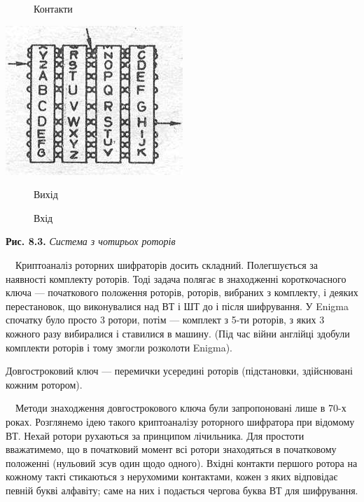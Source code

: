 \begin{figure}
\centering
\begin{minipage}{1in}
Контакти
\end{minipage}
\end{figure}

\bigskip

{\centering 
\includegraphics[width=2.6354in,height=2.2189in]{crypt-img/crypt-img79.jpg}
\par}

\begin{figure}
\centering
\begin{minipage}{0.6583in}
Вихід
\end{minipage}
\end{figure}
\begin{figure}
\centering
\begin{minipage}{0.5417in}
Вхід
\end{minipage}
\end{figure}
{\centering
\textbf{Рис. 8.3. }\textit{Система з чотирьох роторів}
\par}


\bigskip

\ \ Криптоаналіз роторних шифраторів досить складний. Полегшується за наявності
комплекту роторів. Тоді задача полягає в знаходженні короткочасного ключа ---
початкового положення роторів, роторів, вибраних з комплекту, і деяких
перестановок, що виконувалися над ВТ і ШТ до і після шифрування. У Enigma
спочатку було просто 3 ротори, потім --- комплект з 5-ти роторів, з яких 3
кожного разу вибиралися і ставилися в машину. (Під час війни англійці здобули
комплекти роторів і тому змогли розколоти Enigma).

Довгостроковий ключ --- перемички усередині роторів (підстановки, здійснювані
кожним ротором).

\ \ Методи знаходження довгострокового ключа були запропоновані лише в  70-х
роках. Розглянемо ідею такого криптоаналізу роторного шифратора при відомому
ВТ. Нехай ротори рухаються за принципом лічильника. Для простоти вважатимемо,
що в початковий момент всі ротори знаходяться в початковому положенні (нульовий
зсув один щодо одного). Вхідні контакти першого ротора на кожному такті
стикаються з нерухомими контактами, кожен з яких відповідає певній букві
алфавіту; саме на них і подається чергова буква ВТ для шифрування.

